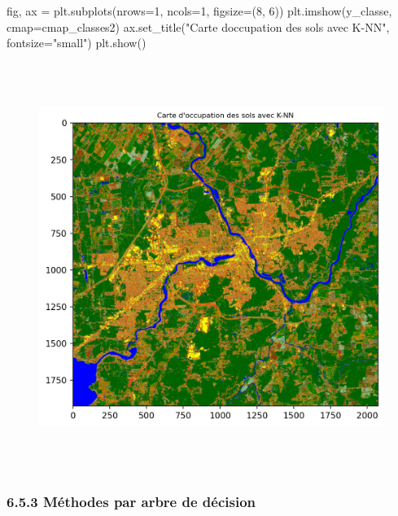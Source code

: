 \documentclass[
]{article}
\newenvironment{Shaded}{}{}
\newcommand{\DecValTok}[1]{\textcolor[rgb]{0.25,0.63,0.44}{#1}}
\newcommand{\NormalTok}[1]{#1}
\newcommand{\OperatorTok}[1]{\textcolor[rgb]{0.40,0.40,0.40}{#1}}
\newcommand{\StringTok}[1]{\textcolor[rgb]{0.25,0.44,0.63}{#1}}
\begin{document}
\label{7ca944cb}
\label{cb35}
\begin{Shaded}
\begin{Highlighting}[]
\NormalTok{fig, ax }\OperatorTok{=}\NormalTok{ plt.subplots(nrows}\OperatorTok{=}\DecValTok{1}\NormalTok{, ncols}\OperatorTok{=}\DecValTok{1}\NormalTok{, figsize}\OperatorTok{=}\NormalTok{(}\DecValTok{8}\NormalTok{, }\DecValTok{6}\NormalTok{))}
\NormalTok{plt.imshow(y\_classe, cmap}\OperatorTok{=}\NormalTok{cmap\_classes2)}
\NormalTok{ax.set\_title(}\StringTok{"Carte d\textquotesingle{}occupation des sols avec K{-}NN"}\NormalTok{, fontsize}\OperatorTok{=}\StringTok{"small"}\NormalTok{)}
\NormalTok{plt.show()}
\end{Highlighting}
\end{Shaded}

\begin{figure}
\centering
\includegraphics[width=5.625in,height=5.21875in]{05-ClassificationsSupervisees_files/figure-html/cell-32-output-1.png}
\caption{}
\end{figure}

\subsubsection{\texorpdfstring{{6.5.3} Méthodes par arbre de
décision}{6.5.3 Méthodes par arbre de décision}}\label{muxe9thodes-par-arbre-de-duxe9cision}
\end{document}

